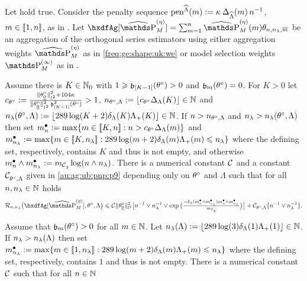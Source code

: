 \begin{thm}\label{au:ag:ub:pnp}
Let  hold true.
Consider the   penalty sequence $\peneSv:=\peneD$,
  $\Di\in\nset{1,\ssY}$, as in .
  Let $\hxdfAg[{\erWe[]}]=\sum_{\Di=1}^{\ssY} \erWe\hxdfPr$ be an aggregation of the orthogonal series estimators using either aggregation weights $\erWe[]$ as in \eqref{freq:ge:shape:uk:we} or model selection weights $\msWe[]$ as in .
  \begin{Liste}[]
  \item[\mylabel{au:ag:ub:pnp:p}{\dgrau\bfseries{(p)}}]Assume there is
    $K\in\Nz_0$ with $1\geq \bias[{[K-1] }](\xdf)>0$ and
    $\bias[\Di](\xdf)=0$. For $K>0$ let
    $c_{\xdf}:=\tfrac{\Vnormlp{\xdf_{\underline{0}}}^2+104\cpen}{\Vnormlp{\xdf_{\underline{0}}}^2\bias[{[K-1]}]^2(\xdf)}>1$,
    $\ssY_{\xdf,\Lambda}:=\floor{c_{\xdf}\DipenSv[K]}\in\Nz$ and
    $\ssE(\xdf,\Lambda):=\floor{289\log(K+2)\cmiSv[K]\miSv[K]}\in\Nz$. If
    $\ssY>\ssY_{\xdf,\Lambda}$ and $\ssE>\ssE(\xdf,\Lambda)$ then set
    $\sDi{\ssY}:=\max\{\Di\in\nset{K,\ssY}:\ssY>c_{\xdf}\DipenSv\}$
    and
    $\sDi{\ssE}:=\max\{\Di\in\nset{K,\ssE}:289\log(\Di+2)\cmiSv[\Di]\miSv[\Di]\leq\ssE\}$
    where the defining set, respectively, contains $K$ and thus is not
    empty, and otherwise $\sDi{\ssY}\wedge\sDi{\ssE}:=\Di_{\cst{3}}\log(\ssY\wedge\ssE)$.
    There is a numerical constant $\cst{}$ and a  constant $\cst{\xdf,\Lambda}$ given in
    \eqref{au:ag:ub:pnp:p9} depending only on $\xdf$ and $\Lambda$ such
    that for all $\ssY,\ssE\in\Nz$ holds
    \begin{equation}\label{au:ag:ub:pnp:e1}
       \nmRi{\hxdfAg[{\erWe[]}]}{\xdf,\Lambda}
       \leq
      \cst{}\Vnormlp{\xdf_{\underline{0}}}^2\big[\ssY^{-1}\vee \ssE^{-1} \vee
      \exp\big(\tfrac{-\cmiSv[\sDi{\ssY}\wedge\sDi{\ssE}]\sDi{\ssY}\wedge\sDi{\ssE}}{\Di_{\cst{3}}}\big)\big]\\
      + \cst{\xdf,\Lambda}\{\ssY^{-1}\vee\ssE^{-1}\}.
    \end{equation}
  \item[\mylabel{au:ag:ub:pnp:np}{\dgrau\bfseries{(np)}}] Assume that
    $\bias(\xdf)>0$ for all $\Di\in\Nz$. Let    
    $\ssE(\Lambda):=\floor{289\log(3)\cmiSv[1]\miSv[1]}\in\Nz$. If
    $\ssE>\ssE(\Lambda)$ then set
    $\sDi{\ssE}:=\max\{\Di\in\nset{1,\ssE}:289\log(\Di+2)\cmiSv[\Di]\miSv[\Di]\leq\ssE\}$
    where the defining set, respectively, contains $1$ and thus is not
    empty.  There is a numerical constant $\cst{}$  such that for all $\ssY\in\Nz$

\end{Liste}
\end{thm}
